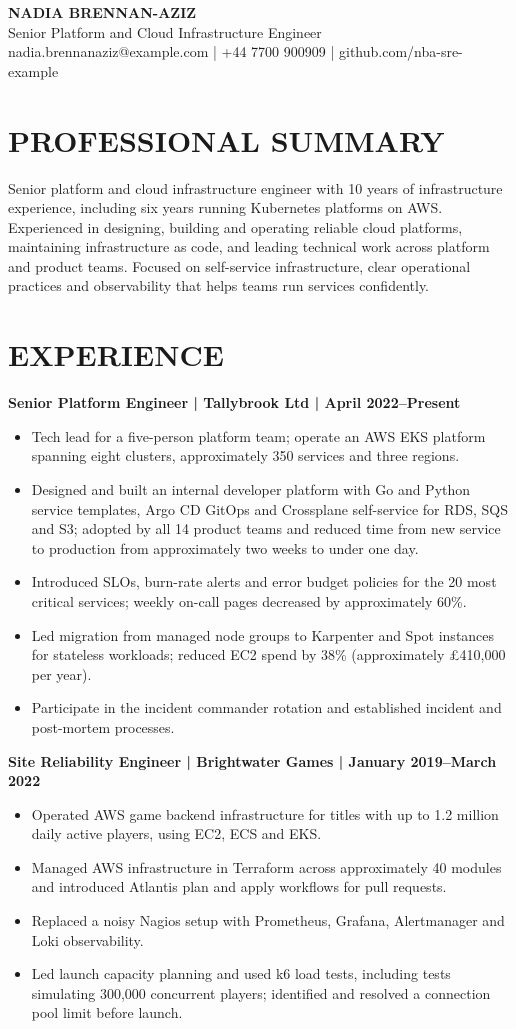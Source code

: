 \documentclass[11pt,a4paper]{article}
\begin{document}
\begin{center}
{\Huge\bfseries\color{primarycolor} NADIA BRENNAN-AZIZ}\\[0.35em]
{\large\color{accentcolor} Senior Platform and Cloud Infrastructure Engineer}\\[0.25em]
{\small nadia.brennanaziz@example.com | +44 7700 900909 | github.com/nba-sre-example}
\end{center}
\section*{PROFESSIONAL SUMMARY}
Senior platform and cloud infrastructure engineer with 10 years of infrastructure experience, including six years running Kubernetes platforms on AWS. Experienced in designing, building and operating reliable cloud platforms, maintaining infrastructure as code, and leading technical work across platform and product teams. Focused on self-service infrastructure, clear operational practices and observability that helps teams run services confidently.
\section*{EXPERIENCE}
\textbf{Senior Platform Engineer | Tallybrook Ltd | April 2022–Present}
\begin{itemize}
\item Tech lead for a five-person platform team; operate an AWS EKS platform spanning eight clusters, approximately 350 services and three regions.
\item Designed and built an internal developer platform with Go and Python service templates, Argo CD GitOps and Crossplane self-service for RDS, SQS and S3; adopted by all 14 product teams and reduced time from new service to production from approximately two weeks to under one day.
\item Introduced SLOs, burn-rate alerts and error budget policies for the 20 most critical services; weekly on-call pages decreased by approximately 60\%.
\item Led migration from managed node groups to Karpenter and Spot instances for stateless workloads; reduced EC2 spend by 38\% (approximately £410,000 per year).
\item Participate in the incident commander rotation and established incident and post-mortem processes.
\end{itemize}
\textbf{Site Reliability Engineer | Brightwater Games | January 2019–March 2022}
\begin{itemize}
\item Operated AWS game backend infrastructure for titles with up to 1.2 million daily active players, using EC2, ECS and EKS.
\item Managed AWS infrastructure in Terraform across approximately 40 modules and introduced Atlantis plan and apply workflows for pull requests.
\item Replaced a noisy Nagios setup with Prometheus, Grafana, Alertmanager and Loki observability.
\item Led launch capacity planning and used k6 load tests, including tests simulating 300,000 concurrent players; identified and resolved a connection pool limit before launch.
\end{itemize}
\end{document}
